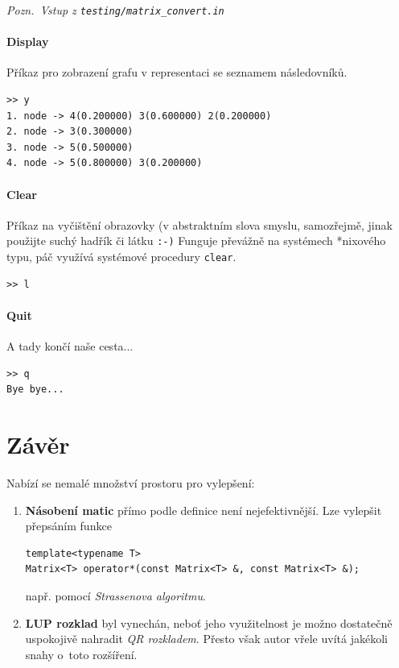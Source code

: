 \documentclass[11pt,a4paper]{article}
\theoremstyle{remark}
\begin{document}
{\noindent \sl Pozn.~Vstup z \tt testing/matrix\_convert.in}

\subsection{Display}
Příkaz pro zobrazení grafu v representaci se seznamem následovníků.



\begin{verbatim}
>> y
1. node -> 4(0.200000) 3(0.600000) 2(0.200000)
2. node -> 3(0.300000)
3. node -> 5(0.500000)
4. node -> 5(0.800000) 3(0.200000)
\end{verbatim}

\subsection{Clear}
Příkaz na vyčištění obrazovky (v abstraktním slova smyslu, samozřejmě, jinak
použijte suchý hadřík či látku {\tt :-)}
Funguje převážně na systémech *nixového typu, páč využívá systémové procedury
\verb=clear=.

\begin{verbatim}
>> l
\end{verbatim}

\subsection{Quit}
A tady končí naše cesta...

\begin{verbatim}
>> q
Bye bye...
\end{verbatim}

\pagebreak

\part{Závěr}

Nabízí se nemalé množství prostoru pro vylepšení:
\begin{enumerate}
  \item {\bf Násobení matic\/} přímo podle definice není nejefektivnější.
    Lze vylepšit přepsáním funkce
\begin{verbatim}template<typename T>
Matrix<T> operator*(const Matrix<T> &, const Matrix<T> &);\end{verbatim}
    např. pomocí \emph{Strassenova algoritmu\/}.
  \item {\bf LUP rozklad\/} byl vynechán, neboť jeho využitelnost je možno
    do\-sta\-teč\-ně uspokojivě nahradit \emph{QR rozkladem\/}.
    Přesto však autor vřele uvítá jakékoli snahy o~toto rozšíření.
\end{enumerate}
\end{document}
